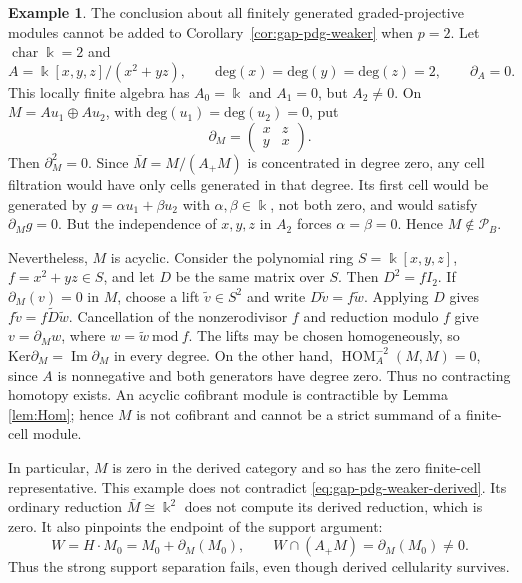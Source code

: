 \documentclass[11pt]{article}
\theoremstyle{definition}
\newtheorem{example}[thm]{Example}
\numberwithin{equation}{section}
\newcommand{\kk}{\Bbbk}
\newcommand{\Pun}{\mathcal{P}_B}
\newcommand{\HOM}{\operatorname{HOM}}
\newcommand{\Ke}{\mathrm{Ker}}
\begin{document}
\begin{example}
\label{ex:weak-endpoint-acyclic}
The conclusion about all finitely generated graded-projective modules
cannot be added to Corollary~\ref{cor:gap-pdg-weaker} when $p=2$.
Let $\operatorname{char}\kk=2$ and
\begin{equation}\label{eq:weak-endpoint-algebra}
 A=\kk[x,y,z]/(x^2+yz),\qquad
 \mathrm{deg}(x)= \mathrm{deg}(y)= \mathrm{deg}(z)=2,\qquad\partial_A=0.
\end{equation}
This locally finite algebra has $A_0=\kk$ and $A_1=0$, but $A_2\ne0$.
On $M=Au_1\oplus Au_2$, with $\mathrm{deg}(u_1)=\mathrm{deg}(u_2)=0$, put
\begin{equation}\label{eq:weak-endpoint-matrix}
 \partial_M=
 \begin{pmatrix}
 x&z\\
 y&x
 \end{pmatrix}.
\end{equation}
Then $\partial_M^2=0$.  Since $\bar M=M/(A_+M)$ is concentrated in
degree zero, any cell filtration would have only cells generated in
that degree.  Its first cell would be generated by
$g=\alpha u_1+\beta u_2$ with $\alpha,\beta\in\kk$, not both zero,
and would satisfy $\partial_Mg=0$.  But the independence of
$x,y,z$ in $A_2$ forces $\alpha=\beta=0$.
Hence $M\notin\Pun$.

Nevertheless, $M$ is acyclic.  Consider the polynomial ring $S=\kk[x,y,z]$,
$f=x^2+yz\in S$, and let $ D$ be the same matrix over $S$.
Then $ D^{2}=fI_2$.  If $\partial_M(v)=0$ in $M$, choose a lift
$\widetilde v\in S^2$ and write
$D\widetilde v=f\widetilde w$.
Applying $ D$ gives
$f\widetilde v=f\widetilde D\widetilde w$.
Cancellation of the nonzerodivisor $f$ and reduction modulo $f$ give
$v=\partial_M w$, where $w=\widetilde{w}~\mathrm{mod}~f$.  The lifts may be chosen homogeneously, so
$\Ke \partial_M =\operatorname{Im} \partial_M$ in every degree.
On the other hand,
$\HOM_A^{-2}(M,M)=0$, since $A$ is nonnegative and both generators
have degree zero.  Thus no contracting homotopy exists.
An acyclic cofibrant module is contractible by Lemma \ref{lem:Hom}; hence $M$ is not cofibrant and cannot be a
strict summand of a finite-cell module.

In particular, $M$ is zero in the derived category and so has the
zero finite-cell representative.  This example does not contradict
\eqref{eq:gap-pdg-weaker-derived}.  Its ordinary reduction
$\bar M\cong\kk^2$ does not compute its derived reduction, which is
zero.  It also pinpoints the endpoint of the support argument:
\[
 W=H\cdot M_0=M_0+\partial_M (M_0),\qquad
 W\cap(A_+M)=\partial_M (M_0)\ne0.
\]
Thus the strong support separation fails, even though derived
cellularity survives.
\end{example}
\end{document}
